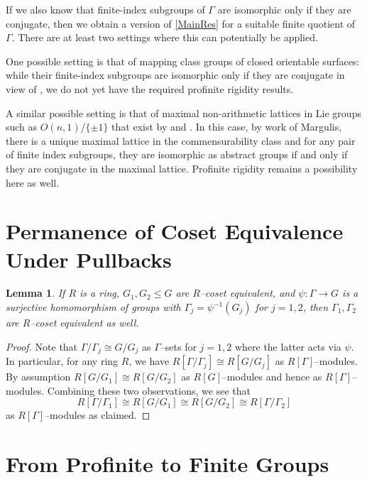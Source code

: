 \documentclass[11pt]{amsart}
\newtheorem{lem}[thm]{Lemma}
\numberwithin{equation}{section}
\begin{document}
If we also know that finite-index subgroups of $\Gamma$ are isomorphic only if they are conjugate, then we obtain a version of \cref{MainRes} for a suitable finite quotient of $\Gamma$. There are at least two settings where this can potentially be applied.

One possible setting is that of mapping class groups of closed orientable surfaces: while their finite-index subgroups are isomorphic only if they are conjugate in view of \cite[Theorem 5]{Iv}, we do not yet have the required profinite rigidity results.

A similar possible setting is that of maximal non-arithmetic lattices in Lie groups such as $O(n,1)/\{\pm 1\}$ that exist by \cite{GPS} and \cite{Margulis}. In this case, by work of Margulis, there is a unique maximal lattice in the commensurability class and for any pair of finite index subgroups, they are isomorphic as abstract groups if and only if they are conjugate in the maximal lattice. Profinite rigidity remains a possibility here as well.

\section{Permanence of Coset Equivalence Under Pullbacks}

\begin{lem} \label{L:RCos}
If $R$ is a ring, $G_1,G_2 \leq G$ are $R$--coset equivalent, and $\psi\colon \Gamma \to G$ is a surjective homomorphism of groups with $\Gamma_j = \psi^{-1}(G_j)$ for $j=1,2$, then $\Gamma_1,\Gamma_2$ are $R$--coset equivalent as well.
\end{lem}

\begin{proof}
Note that $\Gamma/\Gamma_j \cong G/G_j$ as $\Gamma$--sets for $j=1,2$ where the latter acts via $\psi$. In particular, for any ring $R$, we have $R[\Gamma/\Gamma_j] \cong R[G/G_j]$ as $R[\Gamma]$--modules. By assumption $R[G/G_1] \cong R[G/G_2]$ as $R[G]$--modules and hence as $R[\Gamma]$--modules. Combining these two observations, we see that 
\[ R[\Gamma/\Gamma_1] \cong R[G/G_1] \cong R[G/G_2] \cong R[\Gamma/\Gamma_2] \]
as $R[\Gamma]$--modules as claimed.
\end{proof}

\section{From Profinite to Finite Groups}
\end{document}
